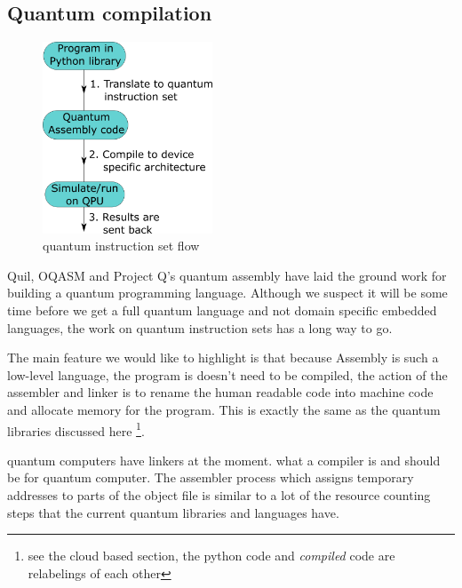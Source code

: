 \subsection{Quantum compilation}

\begin{figure}
    \centering
    \includegraphics[width=0.45\textwidth]{figures/impl/quantumcompilefixrun.png}
    \caption{quantum instruction set flow}
    \label{fig:quantumcompile}
    \vspace{-30pt}
\end{figure}

Quil, OQASM and Project Q's quantum assembly have laid the ground work for building a quantum programming language. Although we suspect it will be some time before we get a full quantum language and not domain specific embedded languages, the work on quantum instruction sets has a long way to go. 

The main feature we would like to highlight is that because Assembly is such a low-level language, the program is doesn't need to be compiled, the action of the assembler and linker is to rename the human readable code into machine code and allocate memory for the program. This is exactly the same as the quantum libraries discussed here \footnote{see the cloud based section, the python code and \textit{compiled} code are relabelings of each other}.

quantum computers have linkers at the moment. what a compiler is and should be for quantum computer. The assembler process which assigns temporary addresses to parts of the object file is similar to a lot of the resource counting steps that the current quantum libraries and languages have.


